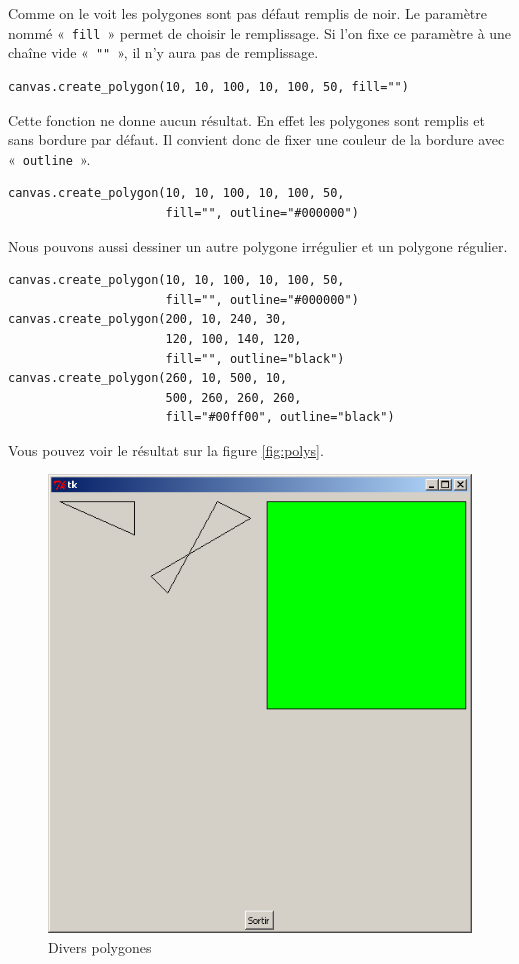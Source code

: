 Comme on le voit les polygones sont pas défaut remplis de noir. Le paramètre nommé « \texttt{fill} » permet de choisir le remplissage. Si l'on fixe ce paramètre à une chaîne vide « \texttt{""} », il n'y aura pas de remplissage.

\begin{Verbatim}[frame=single,rulecolor=\color{mbleu}, label=à taper]
canvas.create_polygon(10, 10, 100, 10, 100, 50, fill="")
\end{Verbatim}

Cette fonction ne donne aucun résultat. En effet les polygones sont remplis et sans bordure par défaut. Il convient donc de fixer une couleur de la bordure avec « \texttt{outline} ».

\begin{Verbatim}[frame=single,rulecolor=\color{mbleu}, label=à taper]
canvas.create_polygon(10, 10, 100, 10, 100, 50, 
                      fill="", outline="#000000")
\end{Verbatim}

Nous pouvons aussi dessiner un autre polygone irrégulier et un polygone régulier.

\begin{Verbatim}[frame=single,rulecolor=\color{mbleu}, label=à taper]
canvas.create_polygon(10, 10, 100, 10, 100, 50,
                      fill="", outline="#000000")
canvas.create_polygon(200, 10, 240, 30,
                      120, 100, 140, 120,
                      fill="", outline="black")
canvas.create_polygon(260, 10, 500, 10,
                      500, 260, 260, 260,
                      fill="#00ff00", outline="black")
\end{Verbatim}

Vous pouvez voir le résultat sur la figure \autoref{fig:polys}.
\begin{figure}[h!]
\centering
\includegraphics[scale=0.4]{images/polys}
\caption{Divers polygones}\label{fig:polys}
\end{figure}

